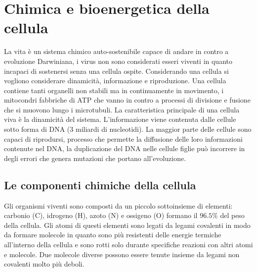 \chapter{Chimica e bioenergetica della cellula}
La vita \`e un sistema chimico auto-sostenibile capace di andare in contro a evoluzione Darwiniana, i virus non sono considerati esseri viventi in quanto incapaci di sostenersi senza
una cellula ospite. Considerando una cellula si vogliono considerare dinamicit\`a, informazione e riproduzione. Una cellula contiene tanti organelli non stabili ma in continuamente in
movimento, i mitocondri fabbriche di  ATP che vanno in contro a processi di divisione e fusione che si muovono lungo i microtubuli. La caratteristica principale di una cellula viva \`e
la dinamicit\`a del sistema. L'informazione viene contenuta dalle cellule sotto forma di DNA (3 miliardi di nucleotidi). La maggior parte delle cellule sono capaci di riprodursi, 
processo che permette la diffusione delle loro informazioni contenute nel DNA, la duplicazione del DNA nelle cellule figlie pu\`o incorrere in degli errori che genera mutazioni che 
portano all'evoluzione. 
\section{Le componenti chimiche della cellula}
Gli organismi viventi sono composti da un piccolo sottoinsieme di elementi: carbonio (C), idrogeno (H), azoto (N) e ossigeno (O) formano il $96.5\%$ del peso della cellula. Gli atomi di
questi elementi sono legati da legami covalenti in modo da formare molecole in quanto sono pi\`u resistenti delle energie termiche all'interno della cellula e sono rotti solo durante
specifiche reazioni con altri atomi e molecole. Due molecole diverse possono essere tenute insieme da legami non covalenti molto pi\`u deboli.
